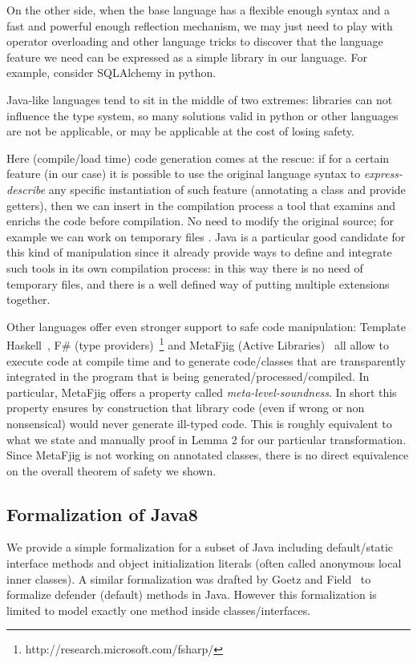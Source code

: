 On the other side, when the base language has a flexible enough syntax and
a fast and powerful enough reflection mechanism, we may just need to play with
operator overloading and other language tricks to discover that the language
feature we need can be expressed as a simple library in our language. For
example, consider SQLAlchemy in python.

Java-like languages tend to sit in the middle of two extremes: libraries
can not influence the type system, so many solutions valid in python or other
languages are not be applicable, or may be applicable at the cost of losing
safety.

Here (compile/load time) code generation comes at the rescue: if for a certain
feature (\mixin in our case) it is possible to use the original language syntax
to \emph{express-describe} any specific instantiation of such feature
(annotating a class and provide getters), then we can insert in the compilation
process a tool that examins and enrichs the code before compilation. No need to
modify the original source; for example we can work on temporary files
. Java is
a particular good candidate for this kind of manipulation since it already
provide ways to define and integrate such tools in its own compilation process:
in this way there is no need of temporary files, and there is a well defined way
of putting multiple extensions together.

Other languages offer even stronger support to safe code manipulation:
Template Haskell~\cite{sheard2002template}, F\# (type providers)~\footnote{http://research.microsoft.com/fsharp/} and MetaFjig (Active Libraries)~\cite{servetto2010metafjig}
all allow to execute code at compile time and to generate code/classes that are transparently integrated in the program that is being generated/processed/compiled.
In particular, MetaFjig offers a property called \emph{meta-level-soundness}. In short this property ensures by construction that library code (even if wrong or non nonsensical) would never generate ill-typed code. This is roughly equivalent to what we state and manually proof in Lemma 2 for our particular transformation.
Since MetaFjig is not working on annotated classes, there is no direct equivalence on the overall theorem of safety we shown.

\subsection{Formalization of Java8}
We provide a simple formalization for a subset of Java
including default/static interface methods and object initialization literals
(often called anonymous local inner classes).  A similar formalization was
drafted by Goetz and Field~\cite{goetz12fdefenders} to formalize defender
(default) methods in Java. However this formalization is limited to model
exactly one method inside classes/interfaces.

